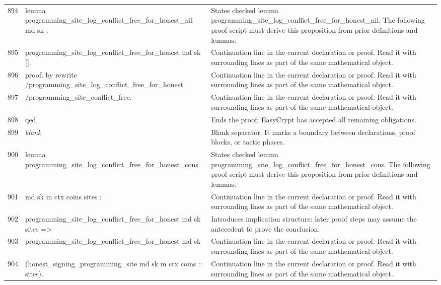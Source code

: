 \documentclass[10pt]{article}
\begin{document}
\begin{longtable}{r L{0.53\textwidth} L{0.37\textwidth}}
894 & {\ttfamily\scriptsize lemma programming\_site\_log\_conflict\_free\_for\_honest\_nil md sk :} & States checked lemma programming\_site\_log\_conflict\_free\_for\_honest\_nil.  The following proof script must derive this proposition from prior definitions and lemmas. \\
895 & {\ttfamily\scriptsize   programming\_site\_log\_conflict\_free\_for\_honest md sk [].} & Continuation line in the current declaration or proof.  Read it with surrounding lines as part of the same mathematical object. \\
896 & {\ttfamily\scriptsize proof. by rewrite /programming\_site\_log\_conflict\_free\_for\_honest} & Continuation line in the current declaration or proof.  Read it with surrounding lines as part of the same mathematical object. \\
897 & {\ttfamily\scriptsize                   /programming\_site\_conflict\_free.} & Continuation line in the current declaration or proof.  Read it with surrounding lines as part of the same mathematical object. \\
898 & {\ttfamily\scriptsize qed.} & Ends the proof; EasyCrypt has accepted all remaining obligations. \\
899 & {\ttfamily\scriptsize \emph{blank}} & Blank separator.  It marks a boundary between declarations, proof blocks, or tactic phases. \\
900 & {\ttfamily\scriptsize lemma programming\_site\_log\_conflict\_free\_for\_honest\_cons} & States checked lemma programming\_site\_log\_conflict\_free\_for\_honest\_cons.  The following proof script must derive this proposition from prior definitions and lemmas. \\
901 & {\ttfamily\scriptsize   md sk m ctx coins sites :} & Continuation line in the current declaration or proof.  Read it with surrounding lines as part of the same mathematical object. \\
902 & {\ttfamily\scriptsize   programming\_site\_log\_conflict\_free\_for\_honest md sk sites =>} & Introduces implication structure: later proof steps may assume the antecedent to prove the conclusion. \\
903 & {\ttfamily\scriptsize   programming\_site\_log\_conflict\_free\_for\_honest md sk} & Continuation line in the current declaration or proof.  Read it with surrounding lines as part of the same mathematical object. \\
904 & {\ttfamily\scriptsize     (honest\_signing\_programming\_site md sk m ctx coins :: sites).} & Continuation line in the current declaration or proof.  Read it with surrounding lines as part of the same mathematical object. \\

\end{longtable}
\end{document}
